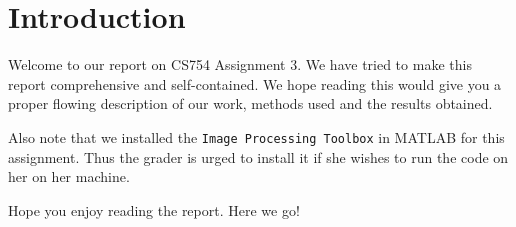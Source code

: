 \documentclass[a4paper,11pt]{article}
\numberwithin{definition}{section}
\numberwithin{mytheorem}{subsection}
\begin{document}

\date{Spring 2022}
\maketitle

\justifying
\tableofcontents

\newpage
\justifying
\section*{Introduction}

Welcome  to our report on CS754 Assignment 3. We have tried to make this report comprehensive and self-contained. We hope reading this would give you a proper flowing description of our work, methods used and the results obtained.

Also note that we installed the \texttt{Image Processing Toolbox} in MATLAB for this assignment. Thus the grader is urged to install it if she wishes to run the code on her on her machine.

Hope you enjoy reading the report. Here we go!
\end{document}
